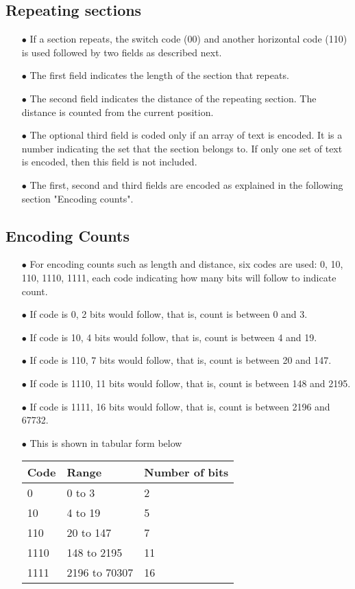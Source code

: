 \documentclass[]{article}
\begin{document}
\subsection{Repeating sections}
\begin{itemize}
	\item[$\bullet$] If a section repeats, the switch code (00) and another horizontal code (110) is used followed by two fields as described next.
  	\item[$\bullet$] The first field indicates the length of the section that repeats.
	\item[$\bullet$] The second field indicates the distance of the repeating section.  The distance is counted from the current position.
	\item[$\bullet$] The optional third field is coded only if an array of text is encoded.  It is a number indicating the set that the section belongs to.  If only one set of text is encoded, then this field is not included. 
	\item[$\bullet$] The first, second and third fields are encoded as explained in the following section "Encoding counts".
\end{itemize}

\subsection{Encoding Counts}
\begin{itemize}
	\item[$\bullet$] For encoding counts such as length and distance, six codes are used: 0, 10, 110, 1110, 1111, each code indicating how many bits will follow to indicate count.
	\item[$\bullet$] If code is 0, 2 bits would follow, that is, count is between 0 and 3.
	\item[$\bullet$] If code is 10, 4 bits would follow, that is, count is between 4 and 19.
	\item[$\bullet$] If code is 110, 7 bits would follow, that is, count is between 20 and 147.
	\item[$\bullet$] If code is 1110, 11 bits would follow, that is, count is between 148 and 2195.
	\item[$\bullet$] If code is 1111, 16 bits would follow, that is, count is between 2196 and 67732.
	\item[$\bullet$] This is shown in tabular form below
	\item[] \begin{tabular}{ | l | l | l |} \hline
	\textbf{Code} & \textbf{Range} & \textbf{Number of bits} \\ \hline
	0 & 0 to 3 & 2 \\ \hline
	10 & 4 to 19 & 5 \\ \hline
	110 & 20 to 147 & 7 \\ \hline
	1110 & 148 to 2195 & 11 \\ \hline
	1111 & 2196 to 70307 & 16 \\ \hline
\end{tabular}
\end{itemize}
\end{document}
